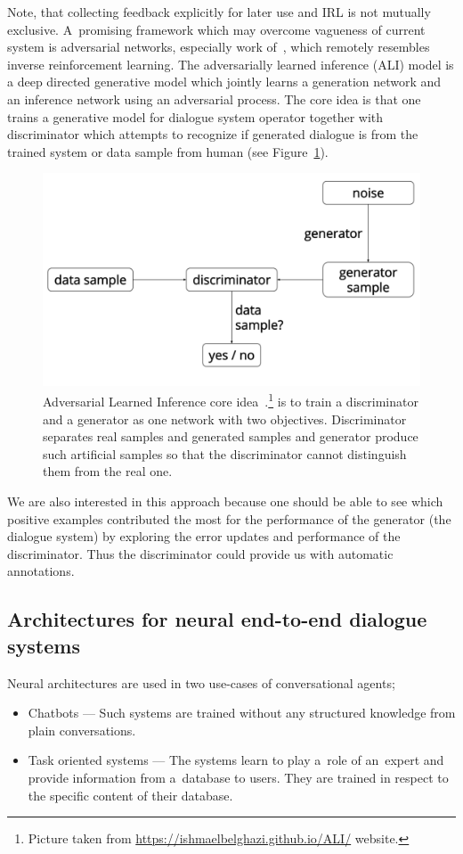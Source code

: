 \documentclass[11pt]{article}
\begin{document}
Note, that collecting feedback explicitly for later use and IRL is not mutually exclusive.
A~promising framework which may overcome vagueness of current system is adversarial networks, especially work of~\cite{dumoulin_adversarially_2016}, which remotely resembles inverse reinforcement learning.
The adversarially learned inference (ALI) model is a deep directed generative model which jointly learns a generation network and an inference network using an adversarial process. 
The core idea is that one trains a generative model for dialogue system operator together with discriminator which attempts to recognize if generated dialogue is from the trained system or data sample from human (see Figure~\ref{fig:gan}).

\begin{figure}[htb]
    \centering
    \includegraphics[width=0.8\linewidth]{gan_simple}
    \caption{Adversarial Learned Inference core idea~\cite{dumoulin_adversarially_2016}.\footnote{Picture taken from \url{https://ishmaelbelghazi.github.io/ALI/} website.} is to train a discriminator and a generator as one network with two objectives. 
    Discriminator separates real samples and generated samples and generator produce such artificial samples so that the discriminator cannot distinguish them from the real one.}
\label{fig:gan}
\end{figure}

We are also interested in this approach because one should be able to see which positive examples contributed the most for the performance of the generator (the dialogue system) by exploring the error updates and performance of the discriminator.
Thus the discriminator could provide us with automatic annotations. 

\subsection{Architectures for neural end-to-end dialogue systems}
\label{sub:nn_architectures}
Neural architectures are used in two use-cases of conversational agents;
\begin{itemize}
    \item Chatbots --- Such systems are trained without any structured knowledge from plain conversations.
    \item Task oriented systems --- The systems learn to play a~role of an~expert and provide information from a~database to users.
        They are trained in respect to the specific content of their database.
\end{itemize}
\end{document}
